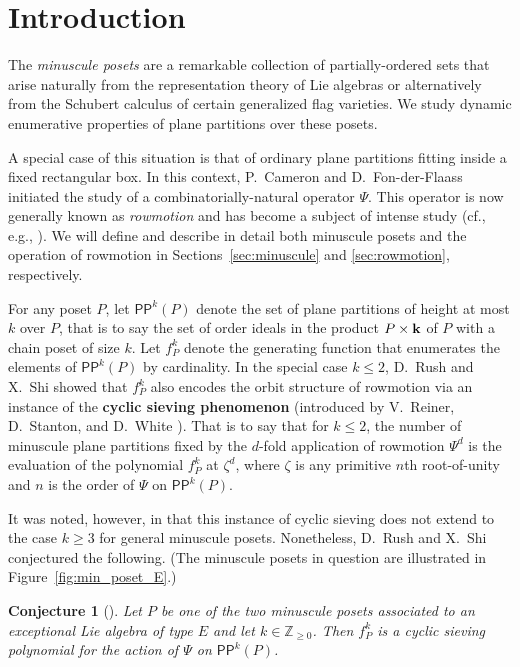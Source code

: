 \documentclass[12pt]{amsart}
\newtheorem{conjecture}[theorem]{Conjecture}
\theoremstyle{definition}
\theoremstyle{remark}
\numberwithin{equation}{section}
\newcommand{\pp}{\ensuremath{\mathsf{PP}}}
\begin{document}
\maketitle


%
\section{Introduction}
%
\label{sec:introduction}

The \emph{minuscule posets} are a remarkable collection of partially-ordered sets that arise naturally from the representation theory of Lie algebras or alternatively from the Schubert calculus of certain generalized flag varieties. We study dynamic enumerative properties of plane partitions over these posets.

A special case of this situation is that of ordinary plane partitions fitting inside a fixed rectangular box. In this context, P.~Cameron and D.~Fon-der-Flaass \cite{Cameron.Fonderflaass} initiated the study of a combinatorially-natural operator $\Psi$. This operator is now generally known as \emph{rowmotion} and has become a subject of intense study (cf., e.g., \cite{Panyushev,Striker.Williams,Armstrong.Stump.Thomas,Rush.Shi,Einstein.Propp,Propp.Roby,Grinberg.Roby:2,Grinberg.Roby:1,DPS,Vorland}).
We will define and describe in detail both minuscule posets and the operation of rowmotion in Sections~\ref{sec:minuscule} and \ref{sec:rowmotion}, respectively.

For any poset $P$, let $\pp^k(P)$ denote the set of plane partitions of height at most $k$ over $P$, that is to say the set of order ideals in the product $P \times {\bf k}$ of $P$ with a chain poset of size $k$. Let $f_P^k$ denote the generating function that enumerates the elements of $\pp^k(P)$  by cardinality. In the special case $k \leq 2$, D.~Rush and X.~Shi \cite{Rush.Shi} showed that $f_P^k$ also encodes the orbit structure of rowmotion via an instance of the {\bf cyclic sieving phenomenon} (introduced by V.~Reiner, D.~Stanton, and D.~White \cite{Reiner.Stanton.White}). That is to say that for $k \leq 2$, the number of minuscule plane partitions fixed by the $d$-fold application of rowmotion $\Psi^d$ is the evaluation of the polynomial $f_P^k$ at $\zeta^d$, where $\zeta$ is any primitive $n$th root-of-unity and $n$ is the order of $\Psi$ on $\pp^k(P)$. 

It was noted, however, in \cite{Rush.Shi} that this instance of cyclic sieving does not extend to the case $k\geq 3$ for general minuscule posets.
Nonetheless, D.~Rush and X.~Shi conjectured the following. (The minuscule posets in question are illustrated in Figure~\ref{fig:min_poset_E}.)
\begin{conjecture}[{\cite[Conjecture~11.1]{Rush.Shi}}]\label{conj:rush.shi}
Let $P$ be one of the two minuscule posets associated to an exceptional Lie algebra of type $E$ and let $k \in \mathbb{Z}_{\geq 0}$. Then $f_P^k$ is a cyclic sieving polynomial for the action of $\Psi$ on $\pp^k(P)$.
\end{conjecture}
\end{document}
